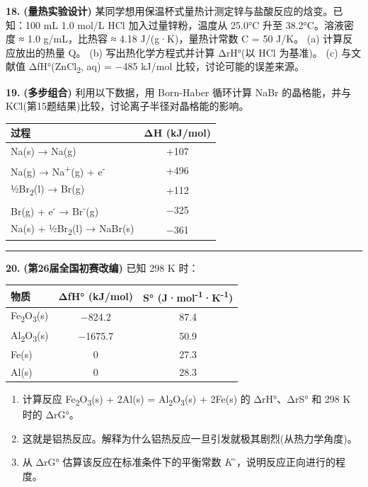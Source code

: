 \textbf{18.} \textbf{(量热实验设计)} 某同学想用保温杯式量热计测定锌与盐酸反应的焓变。已知：100 mL 1.0 mol/L HCl 加入过量锌粉，温度从 25.0°C 升至 38.2°C。溶液密度 ≈ 1.0 g/mL，比热容 ≈ 4.18 J/(g·K)，量热计常数 C = 50 J/K。
(a) 计算反应放出的热量 Q。
(b) 写出热化学方程式并计算 ΔrH°(以 HCl 为基准)。
(c) 与文献值 ΔfH°(ZnCl\textsubscript{2}, aq) = −485 kJ/mol 比较，讨论可能的误差来源。

\textbf{19.} \textbf{(多步组合)} 利用以下数据，用 Born-Haber 循环计算 NaBr 的晶格能，并与 KCl(第15题结果)比较，讨论离子半径对晶格能的影响。

{\def\LTcaptype{none} %
\begin{longtable}[]{@{}lc@{}}
\toprule\noalign{}
过程 & ΔH (kJ/mol) \\
\midrule\noalign{}
\endhead
\bottomrule\noalign{}
\endlastfoot
Na(s) → Na(g) & +107 \\
Na(g) → Na\textsuperscript{+}(g) + e\textsuperscript{-} & +496 \\
½Br\textsubscript{2}(l) → Br(g) & +112 \\
Br(g) + e\textsuperscript{-} → Br\textsuperscript{-}(g) & −325 \\
Na(s) + ½Br\textsubscript{2}(l) → NaBr(s) & −361 \\
\end{longtable}
}

\begin{center}\rule{0.5\linewidth}{0.5pt}\end{center}

\textbf{20.} \textbf{(第26届全国初赛改编)} 已知 298 K 时：

{\def\LTcaptype{none} %
\begin{longtable}[]{@{}lcc@{}}
\toprule\noalign{}
物质 & ΔfH° (kJ/mol) & S° (J·mol\textsuperscript{-1}·K\textsuperscript{-1}) \\
\midrule\noalign{}
\endhead
\bottomrule\noalign{}
\endlastfoot
Fe\textsubscript{2}O\textsubscript{3}(s) & −824.2 & 87.4 \\
Al\textsubscript{2}O\textsubscript{3}(s) & −1675.7 & 50.9 \\
Fe(s) & 0 & 27.3 \\
Al(s) & 0 & 28.3 \\
\end{longtable}
}

\begin{enumerate}
\def\labelenumi{(\alph{enumi})}
\tightlist
\item
  计算反应 Fe\textsubscript{2}O\textsubscript{3}(s) + 2Al(s) = Al\textsubscript{2}O\textsubscript{3}(s) + 2Fe(s) 的 ΔrH°、ΔrS° 和 298 K 时的 ΔrG°。
\item
  这就是铝热反应。解释为什么铝热反应一旦引发就极其剧烈(从热力学角度)。
\item
  从 ΔrG° 估算该反应在标准条件下的平衡常数 \(K^{\circ}\)，说明反应正向进行的程度。
\end{enumerate}

